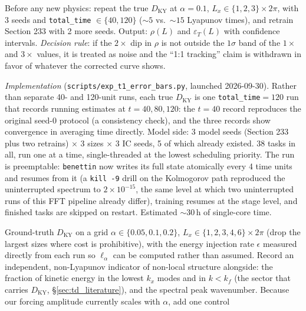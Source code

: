 \documentclass[11pt]{article}
\begin{document}
\begin{description}[style=nextline,leftmargin=1.2em]
\item[T1 --- Error bars on everything already measured.] \label{exp:t1}
  Before any new physics: repeat the true $D_{\mathrm{KY}}$ at $\alpha=0.1$,
  $L_x\in\{1,2,3\}\times2\pi$, with 3 seeds and \texttt{total\_time}
  $\in\{40,120\}$ ($\sim5$ vs.\ $\sim15$ Lyapunov times), and retrain
  Section 233 with 2 more seeds. Output: $\rho(L)$ and $\varepsilon_T(L)$
  with confidence intervals. \emph{Decision rule}: if the $2\times$ dip in
  $\rho$ is not outside the $1\sigma$ band of the $1\times$ and $3\times$
  values, it is treated as noise and the ``1:1 tracking'' claim is
  withdrawn in favor of whatever the corrected curve shows.

  \emph{Implementation} (\texttt{scripts/exp\_t1\_error\_bars.py}, launched
  2026-09-30). Rather than separate 40- and 120-unit runs, each true
  $D_{\mathrm{KY}}$ is one \texttt{total\_time}$=120$ run that records
  running estimates at $t=40,80,120$: the $t=40$ record reproduces the
  original seed-0 protocol (a consistency check), and the three records
  show convergence in averaging time directly. Model side: 3 model seeds
  (Section 233 plus two retrains) $\times$ 3 sizes $\times$ 3 IC seeds, 5 of
  which already existed. 38 tasks in all, run one at a time,
  single-threaded at the lowest scheduling priority. The run is
  preemptable: \texttt{benettin} now writes its full state atomically
  every 4 time units and resumes from it (a \texttt{kill -9} drill on the
  Kolmogorov path reproduced the uninterrupted spectrum to $2\times10^{-15}$,
  the same level at which two uninterrupted runs of this FFT pipeline
  already differ), training resumes at the stage level, and finished tasks
  are skipped on restart. Estimated $\sim$30\,h of single-core time.
\item[T2 --- Map the crossover in $(\alpha, L_x)$.] \label{exp:t2}
  Ground-truth $D_{\mathrm{KY}}$ on a grid $\alpha\in\{0.05,0.1,0.2\}$,
  $L_x\in\{1,2,3,4,6\}\times2\pi$ (drop the largest sizes where cost is
  prohibitive), with the energy injection rate $\epsilon$ measured
  directly from each run so $\ell_\alpha$ can be computed rather than
  assumed. Record an independent, non-Lyapunov indicator of non-local
  structure alongside: the fraction of kinetic energy in the lowest $k_x$
  modes and in $k<k_f$ (the sector that carries $D_{\mathrm{KY}}$,
  \S\ref{sec:td_literature}), and the spectral peak wavenumber. Because
  our forcing amplitude currently scales with $\alpha$, add one control

\end{description}
\end{document}
